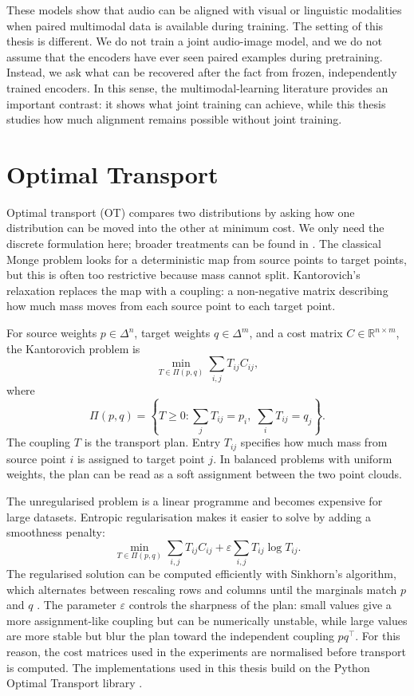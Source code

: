 These models show that audio can be aligned with visual or linguistic modalities when paired multimodal data is available during training. The setting of this thesis is different. We do not train a joint audio-image model, and we do not assume that the encoders have ever seen paired examples during pretraining. Instead, we ask what can be recovered after the fact from frozen, independently trained encoders. In this sense, the multimodal-learning literature provides an important contrast: it shows what joint training can achieve, while this thesis studies how much alignment remains possible without joint training.

\section{Optimal Transport}
\label{sec:ot}

Optimal transport (OT) compares two distributions by asking how one distribution can be moved into the other at minimum cost. We only need the discrete formulation here; broader treatments can be found in \cite{peyre2019computational}. The classical Monge problem looks for a deterministic map from source points to target points, but this is often too restrictive because mass cannot split. Kantorovich's relaxation replaces the map with a coupling: a non-negative matrix describing how much mass moves from each source point to each target point.

For source weights $p \in \Delta^n$, target weights $q \in \Delta^m$, and a cost matrix $C \in \mathbb{R}^{n \times m}$, the Kantorovich problem is
\[
\min_{T \in \Pi(p,q)} \sum_{i,j} T_{ij} C_{ij},
\]
where
\[
\Pi(p,q)=
\left\{
T \geq 0 :
\sum_j T_{ij}=p_i,\;
\sum_i T_{ij}=q_j
\right\}.
\]
The coupling $T$ is the transport plan. Entry $T_{ij}$ specifies how much mass from source point $i$ is assigned to target point $j$. In balanced problems with uniform weights, the plan can be read as a soft assignment between the two point clouds.

The unregularised problem is a linear programme and becomes expensive for large datasets. Entropic regularisation makes it easier to solve by adding a smoothness penalty:
\[
\min_{T \in \Pi(p,q)}
\sum_{i,j} T_{ij} C_{ij}
+
\varepsilon \sum_{i,j} T_{ij}\log T_{ij}.
\]
The regularised solution can be computed efficiently with Sinkhorn's algorithm, which alternates between rescaling rows and columns until the marginals match $p$ and $q$ \cite{cuturi2013sinkhorn}. The parameter $\varepsilon$ controls the sharpness of the plan: small values give a more assignment-like coupling but can be numerically unstable, while large values are more stable but blur the plan toward the independent coupling $pq^\top$. For this reason, the cost matrices used in the experiments are normalised before transport is computed. The implementations used in this thesis build on the Python Optimal Transport library \cite{flamary2021pot}.

